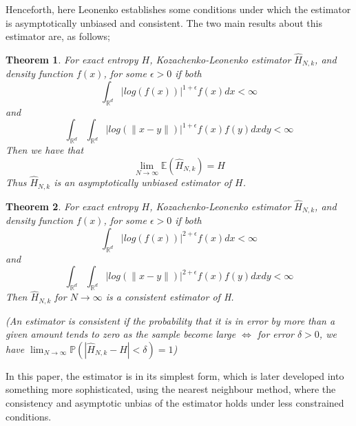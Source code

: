 \documentclass{article}
\newtheorem{theorem}{Theorem}
\begin{document}
Henceforth, here Leonenko establishes some conditions under which the estimator is asymptotically unbiased and consistent. The two main results about this estimator are, as follows;
\begin{theorem} \label{paper1_T1}
For exact entropy $H$, Kozachenko-Leonenko estimator $\hat{H}_{N,k}$, and density function $f(x)$, for some $\epsilon > 0$ if both
\begin{equation} \label{paper1_T1_eq1}
\int_{\mathbb{R}^{d}} | log(f(x))|^{1 + \epsilon} f(x) dx < \infty 
\end{equation}
and
\begin{equation} \label{paper1_T1_eq2}
\int_{\mathbb{R}^{d}} \int_{\mathbb{R}^{d}} | log(\|x-y\|)|^{1+ \epsilon} f(x) f(y) dx dy < \infty
\end{equation}
Then we have that 
\begin{equation} 
\lim_{N \to \infty} \mathbb{E} (\hat{H}_{N, k}) = H \nonumber
\end{equation}
Thus $\hat{H}_{N, k}$ is an asymptotically unbiased estimator of $H$.
\end{theorem}

\begin{theorem} \label{paper1_T2}
For exact entropy $H$, Kozachenko-Leonenko estimator $\hat{H}_{N,k}$, and density function $f(x)$, for some $\epsilon > 0$ if both
\begin{equation} \label{paper1_T2_eq1}
\int_{\mathbb{R}^{d}} | log(f(x))|^{2 + \epsilon} f(x) dx < \infty \nonumber
\end{equation}
and
\begin{equation} \label{paper1_T2_eq2}
\int_{\mathbb{R}^{d}} \int_{\mathbb{R}^{d}} | log(\|x-y\|)|^{2+ \epsilon} f(x) f(y) dx dy < \infty \nonumber
\end{equation}
Then $\hat{H}_{N, k}$ for $N \to \infty$ is a consistent estimator of H.

(An estimator is consistent if the probability that it is in error by more than a given amount tends to zero as the sample become large $\Leftrightarrow $ for error $\delta > 0$, we have $\lim_{N \to \infty} \mathbb{P}(|\hat{H}_{N,k} - H| < \delta) = 1$) 
\end{theorem}

In this paper, the estimator is in its simplest form, which is later developed into something more sophisticated, using the nearest neighbour method, where the consistency and asymptotic unbias of the estimator holds under less constrained conditions.
\end{document}
